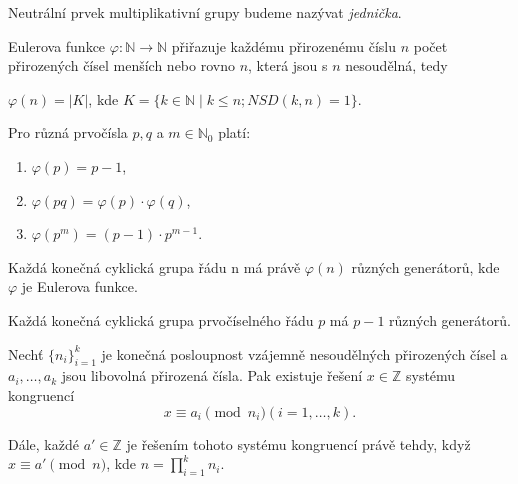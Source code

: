 \documentclass[
  program=infoi,
  biblatex=false,
  figures=true,
  glossaries,
  tables=false,
  sourcecodes=true,
  index
]{kidiplom}
\begin{document}
    \begin{definition}\label{def:neutral-member}
        Neutrální prvek multiplikativní grupy budeme nazývat \emph{jednička}.
    \end{definition}




    \begin{definition}\label{def:euler-function}
        Eulerova funkce $\varphi: \mathbb{N} \rightarrow \mathbb{N}$ přiřazuje každému přirozenému číslu $n$
        počet přirozených čísel menších nebo rovno $n$, která jsou s $n$ nesoudělná, tedy

        \begin{center}
            $\varphi(n) = |K|$, kde $K = \{k \in \mathbb{N} \mid k \leq n; NSD(k,n)=1\}$.
        \end{center}

    \end{definition}

    \begin{theorem}\label{the:euler-function-primes}
        Pro různá prvočísla $p,q$ a $m \in \mathbb{N}_0$ platí:
        \begin{enumerate}[label=(\alph*)]
            \item
                $\varphi(p) = p-1$,
            \item
                $\varphi(pq) = \varphi(p) \cdot \varphi(q)$,
            \item
                $\varphi(p^m) = (p-1) \cdot p^{m-1}$.
        \end{enumerate}
    \end{theorem}

    \begin{theorem}\label{the:generators-count}
        Každá konečná cyklická grupa řádu n má právě $\varphi(n)$ různých generátorů, kde $\varphi$ je Eulerova funkce.
    \end{theorem}

    \begin{consequence}\label{con:generators-count}
        Každá konečná cyklická grupa prvočíselného řádu $p$ má $p-1$ různých generátorů.
    \end{consequence}

    \begin{theorem}\label{the:chinese-remainder}

        Nechť $\{n_i\}^{k}_{i=1}$ je konečná posloupnost vzájemně nesoudělných přirozených čísel a
        $a_i, \ldots, a_k$ jsou libovolná přirozená čísla.
        Pak existuje řešení $x \in \mathbb{Z}$ systému kongruencí
        \[
            x \equiv a_i \pmod{n_i}       (i = 1, \ldots, k).
        \]

        Dále, každé $a' \in \mathbb{Z}$ je řešením tohoto systému kongruencí právě tehdy, když
        $x \equiv a' \pmod{n}$, kde $n = \prod^{k}_{i=1}{n_i}$.

    \end{theorem}
\end{document}
